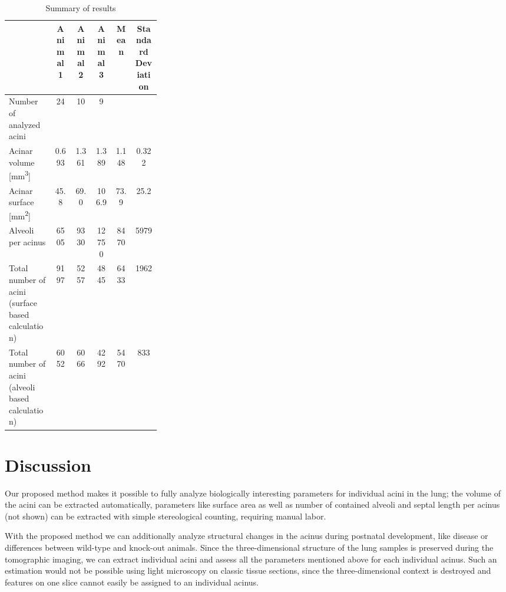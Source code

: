 \documentclass[a4paper,DIV=calc,abstract,english]{scrartcl}
\newcommand{\numberofaciniB}{24}
\newcommand{\numberofaciniD}{10}
\newcommand{\numberofaciniE}{9}
\newcommand{\totalnumberofaciniB}{9197}
\newcommand{\totalnumberofaciniD}{5257}
\newcommand{\totalnumberofaciniE}{4845}
\newcommand{\meantotalnumberofacini}{6433}
\newcommand{\meantotalnumberofaciniSTD}{1962} %
\newcommand{\totalnumberofaciniBVariant}{6052}
\newcommand{\totalnumberofaciniDVariant}{6066}
\newcommand{\totalnumberofaciniEVariant}{4292}
\newcommand{\meantotalnumberofaciniVariant}{5470}
\newcommand{\meantotalnumberofaciniSTDVariant}{833} %
\newcommand{\acinarvolumeB}{0.693} %
\newcommand{\acinarvolumeD}{1.361} %
\newcommand{\acinarvolumeE}{1.389} %
\newcommand{\meanacinarvolume}{1.148} %
\newcommand{\meanacinarvolumeSTD}{0.322} %
\newcommand{\numberofalveoliB}{6505}
\newcommand{\numberofalveoliD}{9330}
\newcommand{\numberofalveoliE}{12750}
\newcommand{\meannumberofalveoli}{8470} %
\newcommand{\meannumberofalveoliSTD}{5979}
\newcommand{\acinarsurfaceB}{45.8} %
\newcommand{\acinarsurfaceD}{69.0} %
\newcommand{\acinarsurfaceE}{106.9} %
\newcommand{\meanacinarsurface}{73.9} %
\newcommand{\meanacinarsurfaceSTD}{25.2}
\begin{document}
\begin{table}[htb]
	\centering
	\caption{Summary of results}
	\begin{tabular}{p{0.3\linewidth}ccccc}
	\toprule
																	& Animal 1 & Animal 2 & Animal 3 & Mean & Standard Deviation \\
	\midrule
	Number of analyzed acini 									& \numberofaciniB & \numberofaciniD & \numberofaciniE & & \\
	Acinar volume [\si{\milli\meter\cubed}]				& \acinarvolumeB & \acinarvolumeD & \acinarvolumeE & \meanacinarvolume & \meanacinarvolumeSTD \\
	Acinar surface [\si{\milli\meter\squared}]			& \acinarsurfaceB & \acinarsurfaceD & \acinarsurfaceE & \meanacinarsurface & \meanacinarsurfaceSTD \\
	Alveoli per acinus 											& \numberofalveoliB & \numberofalveoliD & \numberofalveoliE & \meannumberofalveoli & \meannumberofalveoliSTD \\
	Total number of acini (surface based calculation)	& \totalnumberofaciniB & \totalnumberofaciniD & \totalnumberofaciniE & \meantotalnumberofacini & \meantotalnumberofaciniSTD \\
	Total number of acini (alveoli based calculation)	& \totalnumberofaciniBVariant & \totalnumberofaciniDVariant & \totalnumberofaciniEVariant & \meantotalnumberofaciniVariant & \meantotalnumberofaciniSTDVariant \\
	\bottomrule
	\end{tabular}
	\label{tab:results}
\end{table}

\section{Discussion}
Our proposed method makes it possible to fully analyze biologically interesting parameters for individual acini in the lung; the volume of the acini can be extracted automatically, parameters like surface area as well as number of contained alveoli and septal length per acinus (not shown) can be extracted with simple stereological counting, requiring manual labor.

With the proposed method we can additionally analyze structural changes in the acinus during postnatal development, like disease or differences between wild-type and knock-out animals.
Since the three-dimensional structure of the lung samples is preserved during the tomographic imaging, we can extract individual acini and assess all the parameters mentioned above for each individual acinus.
Such an estimation would not be possible using light microscopy on classic tissue sections, since the three-dimensional context is destroyed and features on one slice cannot easily be assigned to an individual acinus.
\end{document}

